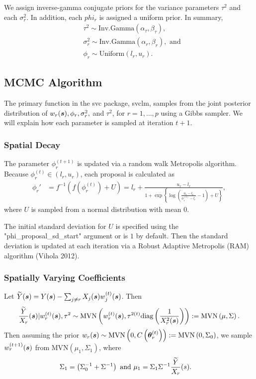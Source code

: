 We assign inverse-gamma conjugate priors for the variance parameters $\tau^2$ and each $\sigma_r^2$. In addition, each $phi_r$ is assigned a uniform prior. In summary,
\begin{align*}
    & \tau^2 \sim \text{Inv.Gamma}(\alpha_\tau, \beta_\tau),\\
    & \sigma_r^2 \sim \text{Inv.Gamma}(\alpha_r, \beta_r), \text{ and}\\
    & \phi_r \sim \text{Uniform}(l_r, u_r).
\end{align*}

\subsection{MCMC Algorithm}
\label{sec:mcmc}

The primary function in the svc package, svclm, samples from the joint posterior distribution of $w_r(\boldsymbol{s}), \phi_r, \sigma_r^2,$ and $\tau^2$, for $r = 1, \dots, p$ using a Gibbs sampler. We will explain how each parameter is sampled at iteration $t+1$.

\subsubsection{Spatial Decay}
\label{sec:spatial_decay}

The parameter $\phi_r^{(t+1)}$ is updated via a random walk Metropolis algorithm. Because $\phi_r^{(t)} \in (l_r, u_r)$, each proposal is calculated as 
\begin{align*}
    \phi_r' &= f^{-1}(f(\phi_r^{(t)}) + U) = l_r + \frac{u_r - l_r}{1 + \exp\left\{\log\left(\frac{u_r - l_r}{\phi_r^{(t)} - l_r} - 1\right) + U\right\}},
\end{align*}
where $U$ is sampled from a normal distribution with mean $0$.

The initial standard deviation for $U$ is specified using the "phi\_proposal\_sd\_start" argument or is $1$ by default. Then the standard deviation is updated at each iteration via a Robust Adaptive Metropolis (RAM) algorithm (Vihola 2012).

\subsubsection{Spatially Varying Coefficients}
\label{sec:svcs}

Let $\widetilde{Y}(\boldsymbol{s}) = Y(\boldsymbol{s}) - \sum_{j\neq r} X_j(\boldsymbol{s})w_j^{(t)}(\boldsymbol{s})$. Then
\begin{align*}
    \frac{\widetilde{Y}}{X_r}(\boldsymbol{s}) | w_r^{(t)}(\boldsymbol{s}), \tau^2 \sim \text{MVN} \left(w_r^{(t)}(\boldsymbol{s}), \tau^{2(t)} \text{diag}\left( \frac{1}{X_r^2(\boldsymbol{s})} \right)\right) := \text{MVN} \left(\mu, \Sigma\right).
\end{align*}
Then assuming the prior $w_r(\boldsymbol{s}) \sim \text{MVN}\left(0, C\left(\boldsymbol{\theta}_r^{(t)}\right)\right) := \text{MVN}\left(0, \Sigma_0\right)$, we sample $w_r^{(t+1)}(\boldsymbol{s})$ from MVN$(\mu_1, \Sigma_1)$, where
\begin{align*}
    \Sigma_1 &= \left(\Sigma_0^{-1} + \Sigma^{-1}\right) \text{ and }
    \mu_1 = \Sigma_1 \Sigma^{-1} \frac{\widetilde{Y}}{X_r}(s).
\end{align*}

